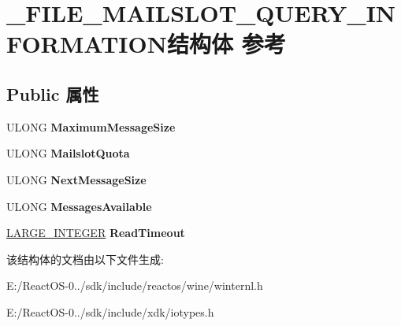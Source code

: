 \hypertarget{struct___f_i_l_e___m_a_i_l_s_l_o_t___q_u_e_r_y___i_n_f_o_r_m_a_t_i_o_n}{}\section{\+\_\+\+F\+I\+L\+E\+\_\+\+M\+A\+I\+L\+S\+L\+O\+T\+\_\+\+Q\+U\+E\+R\+Y\+\_\+\+I\+N\+F\+O\+R\+M\+A\+T\+I\+O\+N结构体 参考}
\label{struct___f_i_l_e___m_a_i_l_s_l_o_t___q_u_e_r_y___i_n_f_o_r_m_a_t_i_o_n}
\subsection*{Public 属性}
\begin{DoxyCompactItemize}
\item 
\mbox{\label{struct___f_i_l_e___m_a_i_l_s_l_o_t___q_u_e_r_y___i_n_f_o_r_m_a_t_i_o_n_a2c5b537a7da3d053cb8ccf88d6b50fdc}} 
U\+L\+O\+NG {\bfseries Maximum\+Message\+Size}
\item 
\mbox{\label{struct___f_i_l_e___m_a_i_l_s_l_o_t___q_u_e_r_y___i_n_f_o_r_m_a_t_i_o_n_a7d2f8bbd3aa31cc0783d076f79510746}} 
U\+L\+O\+NG {\bfseries Mailslot\+Quota}
\item 
\mbox{\label{struct___f_i_l_e___m_a_i_l_s_l_o_t___q_u_e_r_y___i_n_f_o_r_m_a_t_i_o_n_a5d9933a266433f23d93fde151bab0f53}} 
U\+L\+O\+NG {\bfseries Next\+Message\+Size}
\item 
\mbox{\label{struct___f_i_l_e___m_a_i_l_s_l_o_t___q_u_e_r_y___i_n_f_o_r_m_a_t_i_o_n_ade363213e2bbfd3a47bca1bc999bedcc}} 
U\+L\+O\+NG {\bfseries Messages\+Available}
\item 
\mbox{\label{struct___f_i_l_e___m_a_i_l_s_l_o_t___q_u_e_r_y___i_n_f_o_r_m_a_t_i_o_n_a1848415bc2b1694be14097e911924588}} 
\hyperlink{union___l_a_r_g_e___i_n_t_e_g_e_r}{L\+A\+R\+G\+E\+\_\+\+I\+N\+T\+E\+G\+ER} {\bfseries Read\+Timeout}
\end{DoxyCompactItemize}


该结构体的文档由以下文件生成\+:\begin{DoxyCompactItemize}
\item 
E\+:/\+React\+O\+S-\/0../sdk/include/reactos/wine/winternl.\+h\item 
E\+:/\+React\+O\+S-\/0../sdk/include/xdk/iotypes.\+h\end{DoxyCompactItemize}
